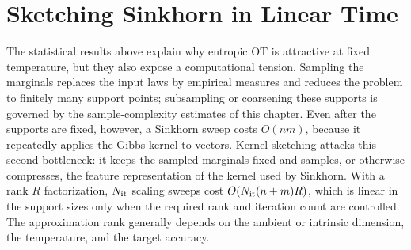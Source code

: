 
\section{Sketching Sinkhorn in Linear Time}
\label{sec-sketching-sinkhorn}

The statistical results above explain why entropic OT is attractive at fixed temperature, but they also expose a computational tension. Sampling the marginals replaces the input laws by empirical measures and reduces the problem to finitely many support points; subsampling or coarsening these supports is governed by the sample-complexity estimates of this chapter. Even after the supports are fixed, however, a Sinkhorn sweep costs \(O(nm)\), because it repeatedly applies the Gibbs kernel to vectors. Kernel sketching attacks this second bottleneck: it keeps the sampled marginals fixed and samples, or otherwise compresses, the feature representation of the kernel used by Sinkhorn. With a rank \(R\) factorization, \(N_{\rm it}\) scaling sweeps cost \(O(N_{\rm it}(n+m)R)\), which is linear in the support sizes only when the required rank and iteration count are controlled. The approximation rank generally depends on the ambient or intrinsic dimension, the temperature, and the target accuracy.

